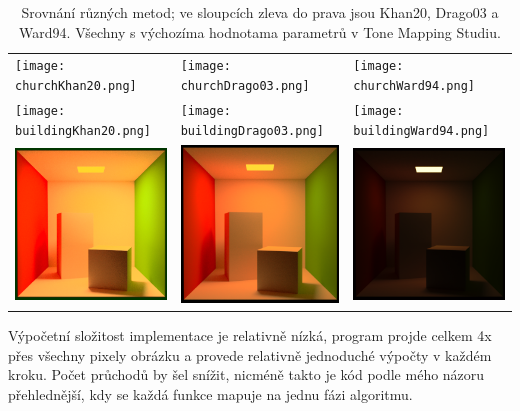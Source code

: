 \documentclass[11pt,a4paper,oneside]{article}
\begin{document}
\begin{table}[htb]
    \centering
    \caption{Srovnání různých metod; ve sloupcích zleva do prava jsou Khan20,
    Drago03 a Ward94. Všechny s výchozíma hodnotama parametrů v Tone Mapping
    Studiu.}
    \label{tab:method-comp}
    \begin{tabular}{lll}
        \texttt{[image: churchKhan20.png]} &
        \texttt{[image: churchDrago03.png]} &
        \texttt{[image: churchWard94.png]} \\
    \texttt{[image: buildingKhan20.png]} &
        \texttt{[image: buildingDrago03.png]} &
        \texttt{[image: buildingWard94.png]}\\
    \includegraphics[width=.33\linewidth,valign=m]{cornell_boxKhan20.png} &
        \includegraphics[width=.33\linewidth,valign=m]{cornell_boxDrago03.png} &
        \includegraphics[width=.33\linewidth,valign=m]{cornell_boxWard94.png}\\
    \end{tabular}
\end{table}
Výpočetní složitost implementace je relativně nízká, program projde celkem 4x
přes všechny pixely obrázku a provede relativně jednoduché výpočty v každém
kroku. Počet průchodů by šel snížit, nicméně takto je kód podle mého názoru
přehlednější, kdy se každá funkce mapuje na jednu fázi algoritmu.
\end{document}
